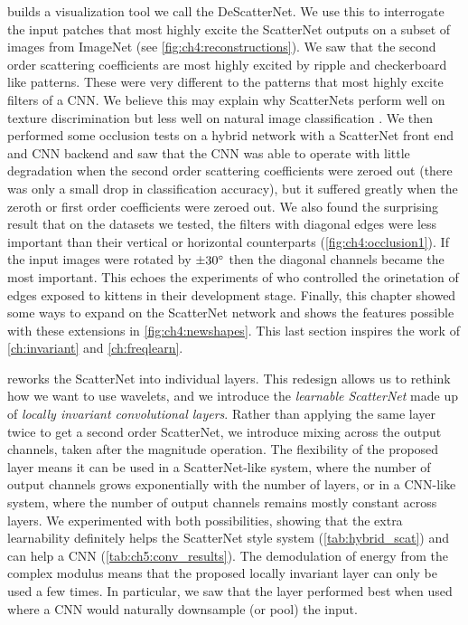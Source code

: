 \textbf{} builds a visualization tool we call the
DeScatterNet. We use this to interrogate the input patches that most highly
excite the ScatterNet outputs on a subset of images from ImageNet (see
\autoref{fig:ch4:reconstructions}). We saw that
the second order scattering coefficients are most highly excited by ripple and
checkerboard like patterns. These were very different to the patterns
that most highly excite filters of a CNN. We believe this may explain why
ScatterNets perform well on texture discrimination \cite{bruna_invariant_2013}
but less well on natural image classification \cite{oyallon_deep_2015}. We then
performed some occlusion tests on a hybrid network with a ScatterNet front end
and CNN backend and saw that the CNN was able to operate with little degradation when the second
order scattering coefficients were zeroed out (there was only a small drop in
classification accuracy), but it suffered greatly when the zeroth or first order
coefficients were zeroed out. We also found the surprising result that on the
datasets we tested, the filters with diagonal edges were less important than their vertical or
horizontal counterparts (\autoref{fig:ch4:occlusion1}). If the input images were
rotated by $\pm 30^{\circ}$ then the diagonal channels became the most important.
This echoes the experiments of
\citeauthor{blakemore_development_1970}\cite{blakemore_development_1970} who
controlled the orinetation of edges exposed to kittens in their development
stage. Finally, this chapter showed some ways to expand on the ScatterNet
network and shows the features possible with these extensions in \autoref{fig:ch4:newshapes}.
This last section inspires the work of \autoref{ch:invariant}
and \autoref{ch:freqlearn}.

\textbf{} reworks the ScatterNet into individual layers.
This redesign allows us to rethink how we want to use wavelets, and we introduce
the \emph{learnable ScatterNet} made up of \emph{locally invariant convolutional
layers}. Rather than applying the same layer twice to get a second order
ScatterNet, we introduce mixing across the output channels, taken after the
magnitude operation. The flexibility of the proposed layer means it can be used
in a ScatterNet-like system, where the number of output channels grows
exponentially with the number of layers, or in a CNN-like system, where the
number of output channels remains mostly constant across layers. We experimented
with both possibilities, showing that the extra learnability definitely helps
the ScatterNet style system (\autoref{tab:hybrid_scat}) and can help a CNN
(\autoref{tab:ch5:conv_results}). The demodulation of energy from the complex
modulus means that the proposed locally invariant layer can only be used a few
times. In particular, we saw that the layer performed best when used where a CNN
would naturally downsample (or pool) the input.

